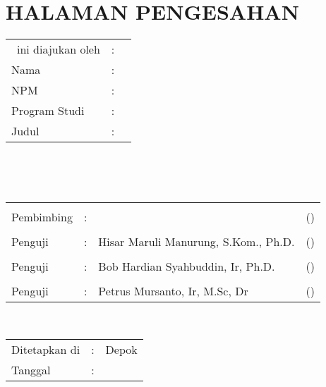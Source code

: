 %
%
%

\chapter*{HALAMAN PENGESAHAN}

\vspace*{0.4cm}
\noindent 

\noindent
\begin{tabular}{ll p{9cm}}
	\type~ini diajukan oleh&: & \\
	Nama&: & \penulis \\
	NPM&: & \npm \\
	Program Studi&: & \programstudi \\
	Judul \type&: & \judul \\
\end{tabular} \\

\vspace*{1.0cm}

\noindent {}\\[0.2cm]

\begin{center}
\end{center}

\vspace*{0.3cm}

\begin{tabular}{l l l l }
	& & & \\
	Pembimbing&: 	& \pembimbing & (\hspace*{3.0cm}) \\
	& & & \\
	Penguji&: 		&   Hisar Maruli Manurung, S.Kom., Ph.D. 	&  (\hspace*{3.0cm}) \\
	& & & \\
	Penguji&: 		&   Bob Hardian Syahbuddin, Ir, Ph.D.	&  (\hspace*{3.0cm}) \\
	& & & \\
	Penguji&: 		&  	Petrus Mursanto, Ir, M.Sc, Dr &  (\hspace*{3.0cm}) \\
\end{tabular}\\


\vspace*{2.0cm}

\begin{tabular}{ll l}
	Ditetapkan di&: & Depok\\
	Tanggal&: & \tanggalLulus \\
\end{tabular}


\newpage